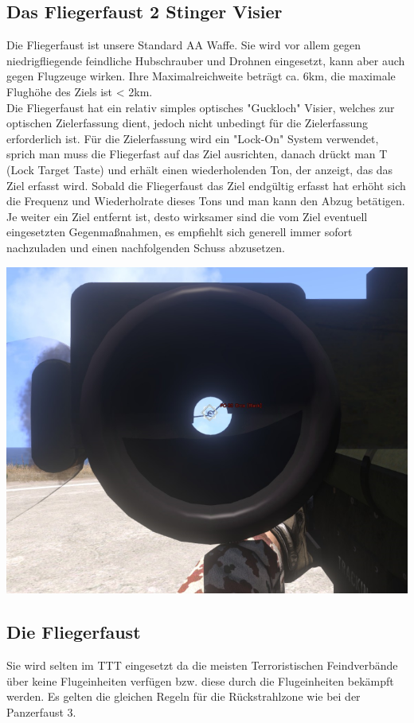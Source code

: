 \subsection{Das Fliegerfaust 2 Stinger Visier}
Die Fliegerfaust ist unsere Standard \acf{AA} Waffe. Sie wird vor allem gegen niedrigfliegende feindliche Hubschrauber und Drohnen eingesetzt, kann aber auch gegen Flugzeuge wirken. Ihre Maximalreichweite beträgt ca. 6km, die maximale Flughöhe des Ziels ist < 2km. \\
Die Fliegerfaust hat ein relativ simples optisches "Guckloch" Visier, welches zur optischen Zielerfassung dient, jedoch nicht unbedingt für die Zielerfassung erforderlich ist. Für die Zielerfassung wird ein "Lock-On" System verwendet, sprich man muss die Fliegerfast auf das Ziel ausrichten, danach drückt man T (Lock Target Taste) und erhält einen wiederholenden Ton, der anzeigt, das das Ziel erfasst wird. Sobald die Fliegerfaust das Ziel endgültig erfasst hat erhöht sich die Frequenz und Wiederholrate dieses Tons und man kann den Abzug betätigen. Je weiter ein Ziel entfernt ist, desto wirksamer sind die vom Ziel eventuell eingesetzten Gegenmaßnahmen, es empfiehlt sich generell immer sofort nachzuladen und einen nachfolgenden Schuss abzusetzen. \\
\begin{minipage}[t]{1\textwidth}
\includegraphics[width=\textwidth]{./Grafiken/Abschnitt/Fliegerfaust_Visier.png}
\end{minipage}

\subsection{Die Fliegerfaust}
Sie wird selten im TTT eingesetzt da die meisten Terroristischen Feindverbände über keine Flugeinheiten verfügen bzw. diese durch die Flugeinheiten bekämpft werden. Es gelten die gleichen Regeln für die Rückstrahlzone wie bei der Panzerfaust 3.\\

